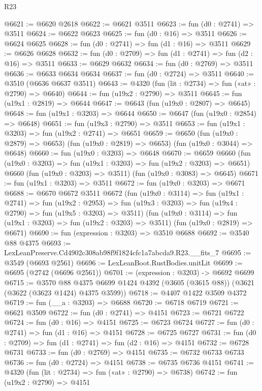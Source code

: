 \begin{lexlean}{R23}
\begin{coremodule}
@6621 := @6620 @2618
@6622 := @6621 @3511
@6623 := fun (d0 : @2741) => @3511
@6624 := @6622 @6623
@6625 := fun (d0 : @16) => @3511
@6626 := @6624 @6625
@6628 := fun (d0 : @2741) => fun (d1 : @16) => @3511
@6629 := @6626 @6628
@6632 := fun (d0 : @2709) => fun (d1 : @2741) => fun (d2 : @16) => @3511
@6633 := @6629 @6632
@6634 := fun (d0 : @2769) => @3511
@6636 := @6633 @6634 @6634
@6637 := fun (d0 : @2724) => @3511
@6640 := @3510 (@6636 @6637 @3511)
@6643 := @4320 (fun (lit : @2734) => fun («at» : @2790) => @6640)
@6644 := fun (u19x2 : @2790) => @3511
@6645 := fun (u19x1 : @2819) => @6644
@6647 := @6643 (fun (u19x0 : @2807) => @6645)
@6648 := fun (u19x1 : @3203) => @6644
@6650 := @6647 (fun (u19x0 : @2854) => @6648)
@6651 := fun (u19x3 : @2790) => @3511
@6653 := fun (u19x1 : @3203) => fun (u19x2 : @2741) => @6651
@6659 := @6650
    (fun (u19x0 : @2879) => @6653)
    (fun (u19x0 : @2819) => @6653)
    (fun (u19x0 : @3044) => @6648)
@6660 := fun (u19x0 : @3203) => @6648
@6670 := @6659
    @6660
    (fun (u19x0 : @3203) => fun (u19x1 : @3203) => fun (u19x2 : @3203) => @6651)
    @6660
    (fun (u19x0 : @3203) => @3511)
    (fun (u19x0 : @3083) => @6645)
@6671 := fun (u19x1 : @3203) => @3511
@6672 := fun (u19x0 : @3203) => @6671
@6688 := @6670
    @6672
    @3511
    @6672
    (fun (u19x0 : @3114) =>
    fun (u19x1 : @2741) =>
    fun (u19x2 : @2953) =>
    fun (u19x3 : @3203) => fun (u19x4 : @2790) => fun (u19x5 : @3203) => @3511)
    (fun (u19x0 : @3114) => fun (u19x1 : @3203) => fun (u19x2 : @3203) => @3511)
    (fun (u19x0 : @2819) => @6671)
@6690 := fun (expression : @3203) => @3510 @6688
@6692 := @3540 @88 @4375
@6693 := LexLeanPreserve.Cd4902c308ab98f9f1824cfc1a7abcda9.R23.__fits_7
@6695 := @3549 (@6693 @2561)
@6696 := LexLeanBoot.RustBodies.unitLit
@6699 := @6695 (@2742 (@6696 @2561))
@6701 := (expression : @3203) -> @6692 @6699
@6715 := @3570
    @88
    @4375
    @6699
    @1424
    @4392
    (@3605 (@3615 @88))
    (@3621 (@3622 (@3623 @1424) @4375 @3599))
@6718 := @4407 @1422 @3509 @4372
@6719 := fun (__a : @3203) => @6688
@6720 := @6718 @6719
@6721 := @6621 @3509
@6722 := fun (d0 : @2741) => @4151
@6723 := @6721 @6722
@6724 := fun (d0 : @16) => @4151
@6725 := @6723 @6724
@6727 := fun (d0 : @2741) => fun (d1 : @16) => @4151
@6728 := @6725 @6727
@6731 := fun (d0 : @2709) => fun (d1 : @2741) => fun (d2 : @16) => @4151
@6732 := @6728 @6731
@6733 := fun (d0 : @2769) => @4151
@6735 := @6732 @6733 @6733
@6736 := fun (d0 : @2724) => @4151
@6738 := @6735 @6736 @4151
@6741 := @4320 (fun (lit : @2734) => fun («at» : @2790) => @6738)
@6742 := fun (u19x2 : @2790) => @4151

\end{coremodule}
\end{lexlean}
